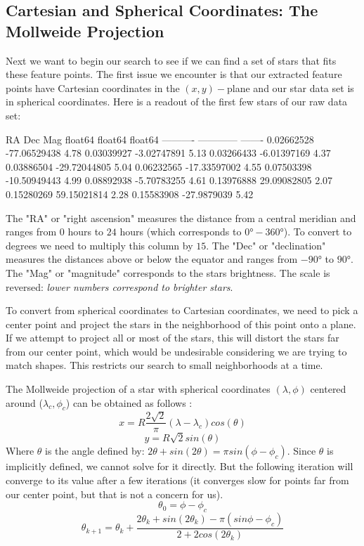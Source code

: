 \documentclass[paper=a4, fontsize=11pt]{scrartcl} %
\begin{document}
\subsection{Cartesian and Spherical Coordinates: The Mollweide Projection}
Next we want to begin our search to see if we can find a set of stars that fits these feature points. The first issue we encounter is that our extracted feature points have Cartesian coordinates in the $(x,y)-$plane and our star data set is in spherical coordinates. Here is a readout of the first few stars of our raw data set:
\begin{python}
	   RA         Dec        Mag  
	float64     float64    float64
	---------- ------------ -------
	0.02662528 -77.06529438    4.78
	0.03039927  -3.02747891    5.13
	0.03266433  -6.01397169    4.37
	0.03886504 -29.72044805    5.04
	0.06232565 -17.33597002    4.55
	0.07503398 -10.50949443    4.99
	0.08892938  -5.70783255    4.61
	0.13976888  29.09082805    2.07
	0.15280269  59.15021814    2.28
	0.15583908  -27.9879039    5.42
\end{python}
The "RA" or "right ascension" measures the distance from a central meridian and ranges from $0$ hours to $24$ hours (which corresponds to $0\si{\degree}-360\si{\degree}$). To convert to degrees we need to multiply this column by $15$.
The "Dec" or "declination" measures the distances above or below the equator and ranges from $-90\si{\degree}$ to $90\si{\degree}$. The "Mag" or "magnitude" corresponds to the stars brightness. The scale is reversed: \textit{lower numbers correspond to brighter stars}.

To convert from spherical coordinates to Cartesian coordinates, we need to pick a center point and project the stars in the neighborhood of this point onto a plane.  If we attempt to project all or most of the stars, this will distort the stars far from our center point, which would be undesirable considering we are trying to match shapes.  This restricts our search to small neighborhoods at a time.

The Mollweide projection of a star with spherical coordinates $(\lambda,\phi)$ centered around ($\lambda_c,\phi_c$) can be obtained as follows \cite{Snyder1987}:
$$
x = R\frac{2\sqrt{2}}{\pi}(\lambda-\lambda_c)cos(\theta)$$$$
y = R\sqrt{2}sin(\theta)
$$
Where $\theta$ is the angle defined by: $2\theta + sin(2\theta)=\pi sin(\phi-\phi_c)$.  Since $\theta$ is implicitly defined, we cannot solve for it directly. But the following iteration will converge to its value after a few iterations (it converges slow for points far from our center point, but that is not a concern for us).
$$
\theta_0 = \phi-\phi_c
$$$$
\theta_{k+1} = \theta_k + \frac{2\theta_k+sin(2\theta_k)-\pi(sin\phi-\phi_c)}{2+2cos(2\theta_k)}
$$
\end{document}
